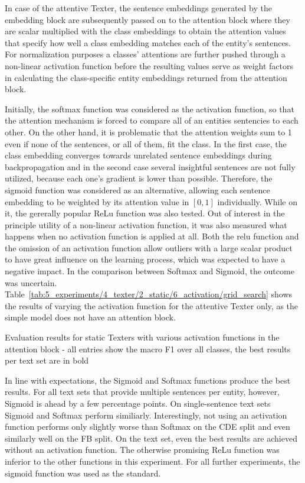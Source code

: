 In case of the attentive Texter, the sentence embeddings generated by the embedding block are subsequently passed on to the attention block where they are scalar multiplied with the class embeddings to obtain the attention values that specify how well a class embedding matches each of the entity's sentences. For normalization purposes a classes' attentions are further pushed through a non-linear activation function before the resulting values serve as weight factors in calculating the class-specific entity embeddings returned from the attention block.

Initially, the softmax function was considered as the activation function, so that the attention mechanism is forced to compare all of an entities sentencies to each other. On the other hand, it is problematic that the attention weights sum to 1 even if none of the sentences, or all of them, fit the class. In the first case, the class embedding converges towards unrelated sentence embeddings during backpropagation and in the second case several insightful sentences are not fully utilized, because each one's gradient is lower than possible. Therefore, the sigmoid function was considered as an alternative, allowing each sentence embedding to be weighted by its attention value in $[0, 1]$ individually. While on it, the gererally popular ReLu function was also tested. Out of interest in the principle utility of a non-linear activation function, it was also measured what happens when no activation function is applied at all. Both the relu function and the omission of an activation function allow outliers with a large scalar product to have great influence on the learning process, which was expected to have a negative impact. In the comparison between Softmax and Sigmoid, the outcome was uncertain. Table~\ref{tab:5_experiments/4_texter/2_static/6_activation/grid_search} shows the results of varying the activation function for the attentive Texter only, as the simple model does not have an attention block.

\begin{table}[t]
    \centering
    
    \caption{Evaluation results for static Texters with various activation functions in the attention block - all entries show the macro F1 over all classes, the best results per text set are in bold}
    \label{tab:5_experiments/4_texter/2_static/6_activation/grid_search}
\end{table}

In line with expectations, the Sigmoid and Softmax functions produce the best results. For all text sets that provide multiple sentences per entity, however, Sigmoid is ahead by a few percentage points. On single-sentence text sets Sigmoid and Softmax perform similiarly. Interestingly, not using an activation function performs only slightly worse than Softmax on the CDE split and even similarly well on the FB split. On the text set, even the best results are achieved without an activation function. The otherwise promising ReLu function was inferior to the other functions in this experiment. For all further experiments, the sigmoid function was used as the standard.
